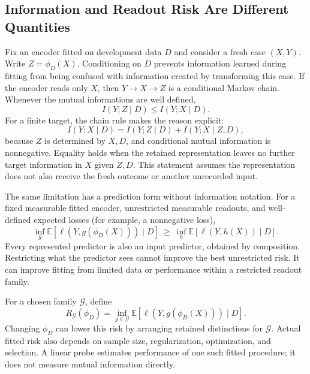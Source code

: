 \subsection{Information and Readout Risk Are Different Quantities}

Fix an encoder fitted on development data $D$ and consider a fresh case $(X,Y)$. Write $Z=\phi_D(X)$. Conditioning on $D$ prevents information learned during fitting from being confused with information created by transforming this case. If the encoder reads only $X$, then $Y\!\to\!X\!\to\!Z$ is a conditional Markov chain. Whenever the mutual informations are well defined,
\[
I(Y;Z\mid D)\le I(Y;X\mid D).
\]
For a finite target, the chain rule makes the reason explicit:
\[
I(Y;X\mid D)=I(Y;Z\mid D)+I(Y;X\mid Z,D),
\]
because $Z$ is determined by $X,D$, and conditional mutual information is nonnegative. Equality holds when the retained representation leaves no further target information in $X$ given $Z,D$. This statement assumes the representation does not also receive the fresh outcome or another unrecorded input.

The same limitation has a prediction form without information notation. For a fixed measurable fitted encoder, unrestricted measurable readouts, and well-defined expected losses (for example, a nonnegative loss),
\[
\inf_g\mathbb E[\ell(Y,g(\phi_D(X)))\mid D]
\ \ge\ \inf_h\mathbb E[\ell(Y,h(X))\mid D].
\]
Every represented predictor is also an input predictor, obtained by composition. Restricting what the predictor sees cannot improve the best unrestricted risk. It can improve fitting from limited data or performance within a restricted readout family.

For a chosen family $\mathcal G$, define
\[
R_{\mathcal G}(\phi_D)=\inf_{g\in\mathcal G}
\mathbb E[\ell(Y,g(\phi_D(X)))\mid D].
\]
Changing $\phi_D$ can lower this risk by arranging retained distinctions for $\mathcal G$. Actual fitted risk also depends on sample size, regularization, optimization, and selection. A linear probe estimates performance of one such fitted procedure; it does not measure mutual information directly.

